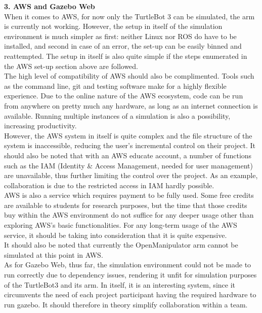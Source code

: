 \documentclass[plainarticle,zihtitle,english,final,hyperref,utf8]{zihpub}
\begin{document}
\textbf{3. AWS and Gazebo Web}\\
When it comes to AWS, for now only the TurtleBot 3 can be simulated, the arm is currently not working. However, the setup in itself of the simulation environment is much simpler as first: neither Linux nor ROS do have to be installed, and second in case of an error, the set-up can be easily binned and reattempted. The setup in itself is also quite simple if the steps enumerated in the AWS set-up section above are followed.\\
\newline
The high level of compatibility of AWS should also be complimented. Tools such as the command line, git and testing software make for a highly flexible experience. Due to the online nature of the AWS ecosystem, code can be run from anywhere on pretty much any hardware, as long as an internet connection is available. Running multiple instances of a simulation is also a possibility, increasing productivity.\\
\newline
However, the AWS system in itself is quite complex and the file structure of the system is inaccessible, reducing the user’s incremental control on their project. It should also be noted that with an AWS educate account, a number of functions such as the IAM (Identity \& Access Management, needed for user management) are unavailable, thus further limiting the control over the project. As an example, collaboration is due to the restricted access in IAM hardly possible.\\
\newline
AWS is also a service which requires payment to be fully used. Some free credits are available to students for research purposes, but the time that those credits buy within the AWS environment do not suffice for any deeper usage other than exploring AWS’s basic functionalities.  For any long-term usage of the AWS service, it should be taking into consideration that it is quite expensive.\\
\newline
It should also be noted that currently the OpenManipulator arm cannot be simulated at this point in AWS.\\
\newline
As for Gazebo Web, thus far, the simulation environment could not be made to run correctly due to dependency issues, rendering it unfit for simulation purposes of the TurtleBot3 and its arm. In itself, it is an interesting system, since it circumvents the need of each project participant having the required hardware to run gazebo. It should therefore in theory simplify collaboration within a team. 
\end{document}
